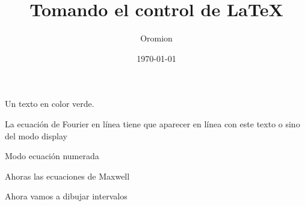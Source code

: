 \documentclass{article}
\title{Tomando el control de \LaTeX}
\author{Oromion}
\date{\today}
\begin{document}
\maketitle

\textcolor{myGreen}{Un texto en color verde.}

La ecuación de Fourier en línea  tiene que aparecer en línea con este texto o sino del modo display \Fourier[disp]

Modo ecuación numerada \Fourier[eq]

\cuadratica{}

\Fourier[eq]

Ahoras las ecuaciones de Maxwell

\textcolor{myBlue}{\Maxwell{}}

\adrenalina{}

Ahora vamos a dibujar intervalos

\end{document}
